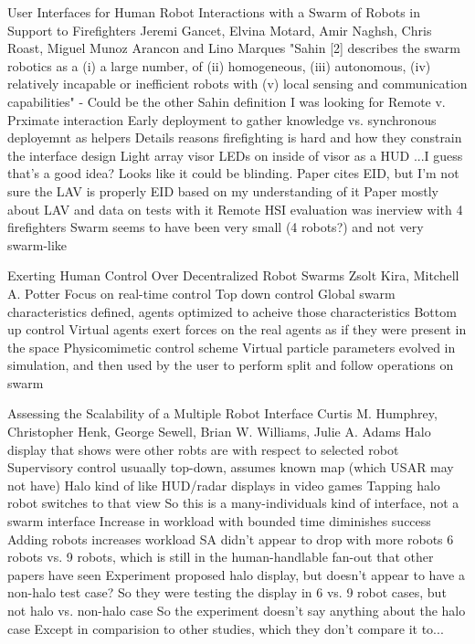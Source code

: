 User Interfaces for Human Robot Interactions with a Swarm of Robots in Support to Firefighters
Jeremi Gancet, Elvina Motard, Amir Naghsh, Chris Roast, Miguel Munoz Arancon and Lino Marques
	"Sahin [2] describes the swarm robotics as a (i) a large number, of (ii) homogeneous, (iii) autonomous, (iv) relatively incapable or inefficient robots with (v) local sensing and communication capabilities" - Could be the other Sahin definition I was looking for
	Remote v. Prximate interaction
	Early deployment to gather knowledge vs. synchronous deployemnt as helpers
	Details reasons firefighting is hard and how they constrain the interface design
	Light array visor
		LEDs on inside of visor as a HUD
		...I guess that's a good idea? Looks like it could be blinding.
	Paper cites EID, but I'm not sure the LAV is properly EID based on my understanding of it
	Paper mostly about LAV and data on tests with it
		Remote HSI evaluation was inerview with 4 firefighters
		Swarm seems to have been very small (4 robots?) and not very swarm-like

Exerting Human Control Over Decentralized Robot Swarms
Zsolt Kira, Mitchell A. Potter
	Focus on real-time control
	Top down control
		Global swarm characteristics defined, agents optimized to acheive those characteristics
	Bottom up control
		Virtual agents exert forces on the real agents as if they were present in the space
	Physicomimetic control scheme
	Virtual particle parameters evolved in simulation, and then used by the user to perform split and follow operations on swarm

Assessing the Scalability of a Multiple Robot Interface
Curtis M. Humphrey, Christopher Henk, George Sewell, Brian W. Williams, Julie A. Adams
	Halo display that shows were other robts are with respect to selected robot
	Supervisory control usuaally top-down, assumes known map (which USAR may not have)
	Halo kind of like HUD/radar displays in video games
	Tapping halo robot switches to that view
		So this is a many-individuals kind of interface, not a swarm interface
	Increase in workload with bounded time diminishes success
		Adding robots increases workload
	SA didn't appear to drop with more robots
		6 robots vs. 9 robots, which is still in the human-handlable fan-out that other papers have seen
	Experiment proposed halo display, but doesn't appear to have a non-halo test case?
		So they were testing the display in 6 vs. 9 robot cases, but not halo vs. non-halo case
		So the experiment doesn't say anything about the halo case
			Except in comparision to other studies, which they don't compare it to...

